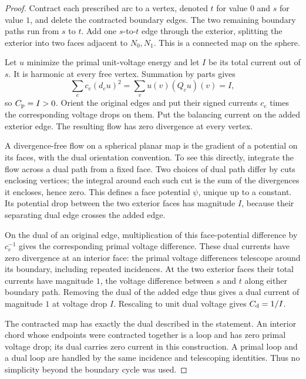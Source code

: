 \begin{proof}
Contract each prescribed arc to a vertex, denoted \(t\) for value \(0\)
and \(s\) for value \(1\), and delete the contracted boundary edges.
The two remaining boundary paths run from \(s\) to \(t\).  Add one
\(s\)-to-\(t\) edge through the exterior, splitting the exterior into
two faces adjacent to \(N_0,N_1\).  This is a connected map on the sphere.

Let \(u\) minimize the primal unit-voltage energy and let \(I\) be its
total current out of \(s\).  It is harmonic at every free vertex.
Summation by parts gives
\[
 \sum_e c_e(d_eu)^2
   =\sum_v u(v)(Q_cu)(v)=I,
\]
so \(C_{\rm p}=I>0\).  Orient the original edges and put their signed
currents \(c_e\) times the corresponding voltage drops on them.  Put the
balancing current on the added exterior edge.  The resulting flow has
zero divergence at every vertex.

A divergence-free flow on a spherical planar map is the gradient of a
potential on its faces, with the dual orientation convention.  To see
this directly, integrate the flow across a dual path from a fixed face.
Two choices of dual path differ by cuts enclosing vertices; the integral
around each such cut is the sum of the divergences it encloses, hence
zero.  This defines a face potential \(\psi\), unique up to a constant.
Its potential drop between the two exterior faces has magnitude \(I\),
because their separating dual edge crosses the added edge.

On the dual of an original edge, multiplication of this face-potential
difference by \(c_e^{-1}\) gives the corresponding primal voltage
difference.  These dual currents have zero divergence at an interior face:
the primal voltage differences telescope around its boundary, including
repeated incidences.  At the two exterior faces their total currents have
magnitude \(1\), the voltage difference between \(s\) and \(t\) along
either boundary path.  Removing the dual of the added edge thus gives a
dual current of magnitude \(1\) at voltage drop \(I\).  Rescaling to
unit dual voltage gives \(C_{\rm d}=1/I\).

The contracted map has exactly the dual described in the statement.
An interior chord whose endpoints were contracted together is a loop and
has zero primal voltage drop; its dual carries zero current in this
construction.  A primal loop and a dual loop are handled by the same
incidence and telescoping identities.  Thus no simplicity beyond the
boundary cycle was used.
\end{proof}

